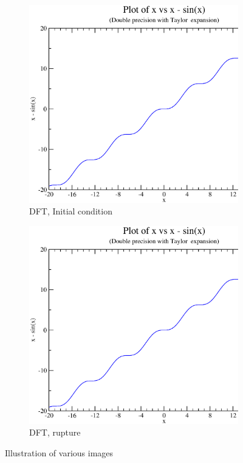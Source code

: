 \documentclass{article}
\begin{document}
\begin{figure}[ht!]
\begin{subfigure}[b]{0.5\linewidth}
    \centering
    \includegraphics[width=0.75\linewidth]{images/c.eps} 
    \caption{DFT, Initial condition} 
    \label{fig7:c} 
  \end{subfigure}%
  \begin{subfigure}[b]{0.5\linewidth}
    \centering
    \includegraphics[width=0.75\linewidth]{images/d.eps} 
    \caption{DFT, rupture} 
    \label{fig7:d} 
  \end{subfigure} 
  \caption{Illustration of various images}
  \label{fig7} 
\end{figure}
\end{document}

